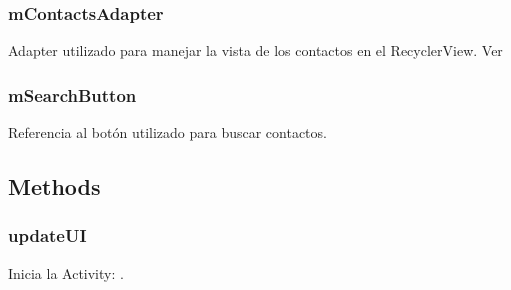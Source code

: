 \documentclass[letterpaper,10pt,english]{sphinxmanual}
\begin{document}
\subsubsection{mContactsAdapter}
\label{Fragments/ContactsFragment:mcontactsadapter}

\begin{fulllineitems}
\label{Fragments/ContactsFragment:com.fiuba.tallerii.jobify.ContactsFragment.mContactsAdapter}
Adapter utilizado para manejar la vista de los contactos en el RecyclerView. Ver 

\end{fulllineitems}



\subsubsection{mSearchButton}
\label{Fragments/ContactsFragment:msearchbutton}

\begin{fulllineitems}
\label{Fragments/ContactsFragment:com.fiuba.tallerii.jobify.ContactsFragment.mSearchButton}
Referencia al botón utilizado para buscar contactos.

\end{fulllineitems}



\subsection{Methods}
\label{Fragments/ContactsFragment:methods}

\subsubsection{updateUI}
\label{Fragments/ContactsFragment:updateui}

\begin{fulllineitems}
\label{Fragments/ContactsFragment:com.fiuba.tallerii.jobify.ContactsFragment.startSearchContactActivity()}
Inicia la Activity: .

\end{fulllineitems}
\end{document}
